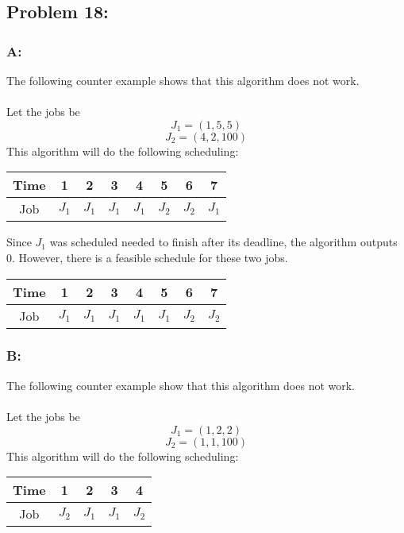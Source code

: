 \documentclass[12pt]{article}
\begin{document}
\subsection*{Problem 18:}
\subsubsection*{A:}
The following counter example shows that this algorithm does not work.\\\\
Let the jobs be
\[
J_1=(1,5,5)
\]
\[
J_2=(4,2,100)
\]
This algorithm will do the following scheduling:\\
\begin{center}
    \begin{tabular}{c|c|c|c|c|c|c|c}
    Time & 1 & 2 & 3 & 4 & 5 & 6 & 7 \\ \hline
    Job & $J_1$ & $J_1$ & $J_1$ & $J_1$ & $J_2$ & $J_2$ & $J_1$ \\
    \end{tabular}
\end{center}  
Since $J_1$ was scheduled needed to finish after its deadline, the algorithm
outputs $0$.  However, there is a feasible schedule for these two jobs.\\
\begin{center}
    \begin{tabular}{c|c|c|c|c|c|c|c}
    Time & 1 & 2 & 3 & 4 & 5 & 6 & 7 \\ \hline
    Job & $J_1$ & $J_1$ & $J_1$ & $J_1$ & $J_1$ & $J_2$ & $J_2$ \\
    \end{tabular}
\end{center}  
\subsubsection*{B:}
The following counter example show that this algorithm does not work.\\\\
Let the jobs be
\[
J_1=(1,2,2)
\]
\[
J_2=(1,1,100)
\]
This algorithm will do the following scheduling:\\
\begin{center}
    \begin{tabular}{c|c|c|c|c}
    Time & 1 & 2 & 3 & 4 \\ \hline
    Job & $J_2$ & $J_1$ & $J_1$ & $J_2$ \\
    \end{tabular}
\end{center}
\end{document}
